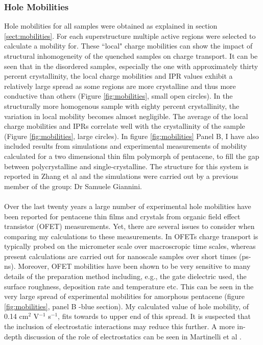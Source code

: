 \subsubsection{Hole Mobilities}
Hole mobilities for all samples were obtained as explained in section \ref{sect:mobilities}. For each superstructure multiple active regions were selected to calculate a mobility for. These ``local" charge mobilities can show the impact of structural inhomogeneity of the quenched samples on charge transport. It can be seen that in the disordered samples, especially the one with approximately thirty percent crystallinity, the local charge mobilities and IPR values exhibit a relatively large spread as some regions are more crystalline and thus more conductive than others (Figure \ref{fig:mobilities}, small open circles). In the structurally more homogenous sample with eighty percent crystallinity, the variation in local mobility becomes almost negligible. The average of the local charge mobilities and IPRs correlate well with the crystallinity of the sample (Figure \ref{fig:mobilities}, large circles). In figure \ref{fig:mobilities} Panel B, I have also included results from simulations and experimental measurements of mobility calculated for a two dimensional thin film polymorph of pentacene, to fill the gap between polycrystalline and single-crystalline. The structure for this system is reported in Zhang et al \cite{Zhang2016TF} and the simulations were carried out by a previous member of the group: Dr Samuele Giannini.
\\\\
Over the last twenty years a large number of experimental hole mobilities have been reported for pentacene thin films and crystals from organic field effect transistor (OFET) measurements. Yet, there are several issues to consider when comparing my calculations to these measurements. In OFETs charge transport is typically probed on the micrometer scale over macroscropic time scales, whereas present calculations are carried out for nanoscale samples over short times (ps-ns). Moreover, OFET mobilities have been shown to be very sensitive to many details of the preparation method including, e.g., the gate dielectric used, the surface roughness, deposition rate and temperature etc. This can be seen in the very large spread of experimental mobilities  for amorphous pentacene (figure \ref{fig:mobilities}, panel B -blue section). My calculated value of hole mobility, of 0.14 cm$^2$ V$^{-1}$ s$^{-1}$, fits towards to upper end of this spread. It is suspected that the inclusion of electrostatic interactions may reduce this further. A more in-depth discussion of the role of electrostatics can be seen in Martinelli et al \cite{ESEffectOnMob}.
